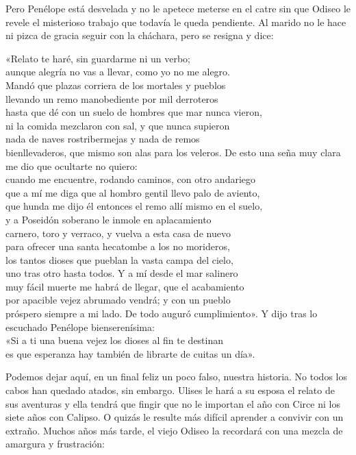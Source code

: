 Pero Penélope está desvelada y no le apetece meterse en el catre sin que Odiseo le revele el misterioso trabajo que todavía le queda pendiente. Al marido no le hace ni pizca de gracia seguir con la cháchara, pero se resigna y dice:

\begin{versocita}
«Relato te haré, sin guardarme ni un verbo;\\
aunque alegría no vas a llevar, como yo no me alegro.\\
Mandó que plazas corriera de los mortales y pueblos\\
llevando un remo manobediente por mil derroteros\\
hasta que dé con un suelo de hombres que mar nunca vieron,\\
ni la comida mezclaron con sal, y que nunca supieron\\
nada de naves rostribermejas y nada de remos\\
bienllevaderos, que mismo son alas para los veleros.
\stanzabreak
De esto una seña muy clara me dio que ocultarte no quiero:\\
cuando me encuentre, rodando caminos, con otro andariego\\
que a mí me diga que al hombro gentil llevo palo de aviento,\\
que hunda me dijo él entonces el remo allí mismo en el suelo,\\
y a Poseidón soberano le inmole en aplacamiento\\
carnero, toro y verraco, y vuelva a esta casa de nuevo\\
para ofrecer una santa hecatombe a los no morideros,\\
los tantos dioses que pueblan la vasta campa del cielo,\\
uno tras otro hasta todos. Y a mí desde el mar salinero\\
muy fácil muerte me habrá de llegar, que el acabamiento\\
por apacible vejez abrumado vendrá; y con un pueblo\\
próspero siempre a mi lado. De todo auguró cumplimiento».
\stanzabreak
Y dijo tras lo escuchado Penélope bienserenísima:\\
«Si a ti una buena vejez los dioses al fin te destinan\\
es que esperanza hay también de librarte de cuitas un día».
\end{versocita}

Podemos dejar aquí, en un final feliz un poco falso, nuestra historia. No todos los cabos han quedado atados, sin embargo. Ulises le hará a su esposa el relato de sus aventuras y ella tendrá que fingir que no le importan el año con Circe ni los siete años con Calipso. O quizás le resulte más difícil aprender a convivir con un extraño. Muchos años más tarde, el viejo Odiseo la recordará con una mezcla de amargura y frustración:

